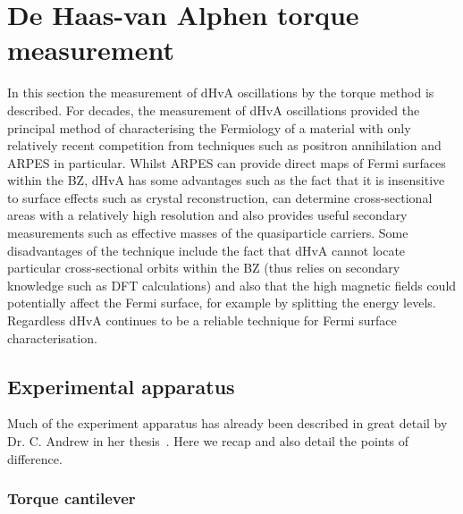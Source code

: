 
\section{De Haas-van Alphen torque measurement}

In this section the measurement of \ac{dHvA} oscillations by the torque method is described. For decades, the measurement of \ac{dHvA} oscillations provided the principal method of characterising the Fermiology of a material with only relatively recent competition from techniques such as positron annihilation and \ac{ARPES} in particular. Whilst \ac{ARPES} can provide direct maps of Fermi surfaces within the \ac{BZ}, \ac{dHvA} has some advantages such as the fact that it is insensitive to surface effects such as crystal reconstruction, can determine cross-sectional areas with a relatively high resolution and also provides useful secondary measurements such as effective masses of the quasiparticle carriers.  Some disadvantages of the technique include the fact that \ac{dHvA} cannot locate particular cross-sectional orbits within the \ac{BZ} (thus relies on secondary knowledge such as \ac{DFT} calculations) and also that the high magnetic fields could potentially affect the Fermi surface, for example by splitting the energy levels. Regardless \ac{dHvA} continues to be a reliable technique for Fermi surface characterisation.

\subsection{Experimental apparatus}

Much of the experiment apparatus has already been described in great detail by Dr. C. Andrew in her thesis~\cite{Andrew2010}. Here we recap and also detail the points of difference. 

\subsubsection{Torque cantilever}

